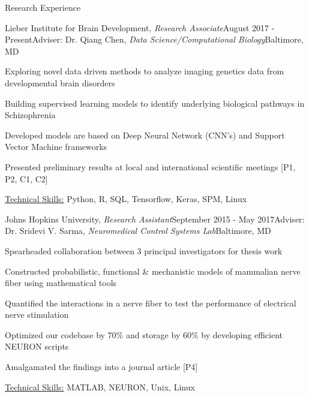 \documentclass{resume}
\begin{document}
  \vspace{1em}

  \begin{rSection}{Research Experience}
\begin{rSubsection}{Lieber Institute for Brain Development, \textit{Research Associate}}{August 2017 - Present}{Adviser: Dr. Qiang Chen, \textit{Data Science/Computational Biology}}{Baltimore, MD}
\item Exploring novel data driven methods to analyze imaging genetics data from developmental brain disorders
\item Building supervised learning models to identify underlying biological pathways in Schizophrenia
\item Developed models are based on Deep Neural Network (CNN's) and Support Vector Machine frameworks
\item Presented preliminary results at local and international scientific meetings [P1, P2, C1, C2]
\item \uline{Technical Skills:} Python, R, SQL, Tensorflow, Keras, SPM, Linux
    \end{rSubsection}

    \begin{rSubsection}{Johns Hopkins University, \textit{Research Assistant}}{September 2015 - May 2017}{Adviser: Dr. Sridevi V. Sarma, \textit{Neuromedical Control Systems Lab}}{Baltimore, MD}
\item Spearheaded collaboration between 3 principal investigators for thesis work
\item Constructed probabilistic, functional \& mechanistic models of mammalian nerve fiber using mathematical tools
\item Quantified the interactions in a nerve fiber to test the performance of electrical nerve stimulation
\item Optimized our codebase by 70\% and storage by 60\% by developing efficient NEURON scripts
\item Amalgamated the findings into a journal article [P4]
\item \uline{Technical Skills:} MATLAB, NEURON, Unix, Linux
    \end{rSubsection}
  

\end{rSection}
\end{document}
